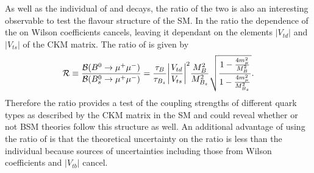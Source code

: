 {As well as the individual \BFs of \bdmumu and \bsmumu decays, the ratio of the two \BFs is also an interesting observable to test the flavour structure of the SM. 
In the ratio the dependence of the \BFs on Wilson coefficients cancels, leaving it dependant on the elements $|V_{td}|$ and $|V_{ts}|$ of the CKM matrix. The ratio of \BFs is given by 
\begin{equation}
  \mathcal{R} \equiv \frac{\mathcal{B}(B^{0} \to \mu^{+} \mu^{-})}{\mathcal{B}(B^{0}_{s}\to \mu^{+} \mu^{-})} = \frac{\tau_{B}}{\tau_{B_{s}}}
 \bigg{|} \frac{V_{td}}{V_{ts}} \bigg{|}^{2} \frac{M_{B}^{2}}{M_{B_{s}}^{2}} \sqrt{\frac{1 - \frac{4m_{\mu}^{2}}{M^{2}_{B}}}{1- \frac{4m_{\mu}^{2}}{M^{2}_{B_{s}}}}}.
\label{eq:BF_ratio}
\end{equation}
Therefore the ratio provides a test of the coupling strengths of different quark types as described by the CKM matrix in the SM and could reveal whether or not BSM theories follow this structure as well. 
An additional advantage of using the ratio of \BFs is that the theoretical uncertainty on the ratio is less than the individual \BFs because sources of uncertainties including those from Wilson coefficients and $|V_{tb}|$ cancel.



}
